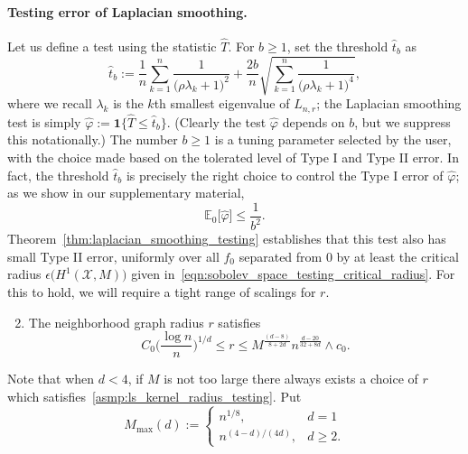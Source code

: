 \documentclass[twoside]{article}
\newcommand{\1}{\mathbf{1}}
\newcommand{\Lap}{L}
\newcommand{\Xset}{\mathcal{X}}
\newcommand{\Ebb}{\mathbb{E}}
\newcommand{\wh}[1]{\widehat{#1}}
\theoremstyle{definition}
\theoremstyle{remark}
\begin{document}
\paragraph{Testing error of Laplacian smoothing.}
Let us define a test using the statistic $\wh{T}$. For $b \geq 1$, set the threshold $\wh{t}_b$ as
\begin{equation*}
\wh{t}_{b} := \frac{1}{n}\sum_{k = 1}^{n} \frac{1}{\bigl(\rho \lambda_k + 1\bigr)^2} + \frac{2b}{n}\sqrt{\sum_{k = 1}^{n} \frac{1}{\bigl(\rho \lambda_k + 1\bigr)^4}},
\end{equation*}
where we recall $\lambda_k$ is the $k$th smallest eigenvalue of $\Lap_{n,r}$; the Laplacian smoothing test is simply $\wh{\varphi} := \1\bigl\{\wh{T} \leq \wh{t}_b\bigr\}$. (Clearly the test $\wh{\varphi}$ depends on $b$, but we suppress this notationally.) The number $b \geq 1$ is a tuning parameter selected by the user, with the choice made based on the tolerated level of Type I and Type II error. In fact, the threshold $\wh{t}_b$ is precisely the right choice to control the Type I error of $\wh{\varphi}$; as we show in our supplementary material,
\begin{equation}
\label{eqn:type_I_error}
\Ebb_0\bigl[\wh{\varphi}\bigr] \leq \frac{1}{b^2}.
\end{equation}
Theorem~\ref{thm:laplacian_smoothing_testing} establishes that this test also has small Type II error, uniformly over all $f_0$ separated from $0$ by at least the critical radius $\epsilon\bigl(H^1(\Xset,M)\bigr)$ given in~\eqref{eqn:sobolev_space_testing_critical_radius}. For this to hold, we will require a tight range of scalings for $r$.
\begin{enumerate}[label=(R\arabic*)]
	\setcounter{enumi}{1}
	\item 
	\label{asmp:ls_kernel_radius_testing}
	The neighborhood graph radius $r$ satisfies
	\begin{equation*}
	C_0\biggl(\frac{\log n}{n}\biggr)^{1/d} \leq r \leq M^{\frac{(d - 8)}{8 + 2d}}n^{\frac{d - 20}{32 + 8d}} \wedge c_0.
	\end{equation*}
\end{enumerate}
Note that when $d < 4$, if $M$ is not too large there always exists a choice of $r$ which satisfies~\ref{asmp:ls_kernel_radius_testing}. Put
\begin{equation*}
M_{\max}(d) := 
\begin{cases*}
n^{1/8},& \textrm{$d = 1$}\\
n^{(4 - d)/(4d)},& \textrm{$d \geq 2$}.
\end{cases*}
\end{equation*}
\end{document}
